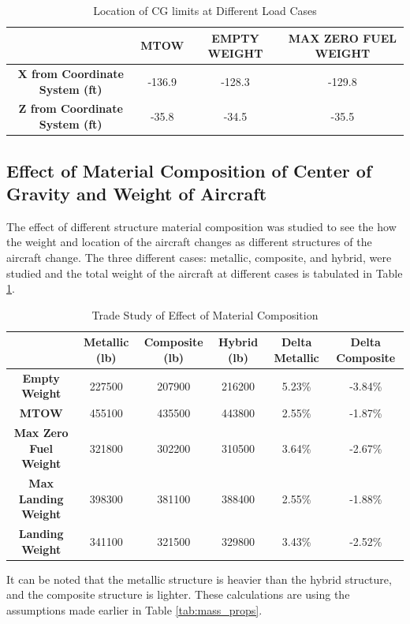 \begin{table}[!h]
\centering
\caption{Location of CG limits at Different Load Cases}
\begin{tabular}{|c||c|c|c|}
\hline
 & \textbf{MTOW} & \textbf{EMPTY WEIGHT} & \textbf{MAX ZERO FUEL WEIGHT} \\ \hline \hline
\textbf{X from Coordinate System (ft)} & -136.9 & -128.3 & -129.8 \\ \hline
\textbf{Z from Coordinate System (ft)} & -35.8 & -34.5 & -35.5 \\ \hline
\end{tabular}
\end{table}

\subsection{Effect of Material Composition of Center of Gravity and Weight of Aircraft}
The effect of different structure material composition was studied to see the how the weight and location of the aircraft changes as different structures of the aircraft change. The three different cases: metallic, composite, and hybrid, were studied and the total weight of the aircraft at different cases is tabulated in Table \ref{tab:mas_study}.

\begin{table}[!h]
\caption{Trade Study of Effect of Material Composition}
\label{tab:mas_study}
\begin{tabular}{|c||c|c|c|c|c|}
\hline
 & \textbf{Metallic (lb)} & \textbf{Composite (lb)} & \textbf{Hybrid (lb)} & \textbf{Delta Metallic} & \textbf{Delta Composite} \\ \hline \hline
\textbf{Empty Weight} & 227500 & 207900 & 216200 & 5.23\% & -3.84\% \\ \hline
\textbf{MTOW} & 455100 & 435500 & 443800 & 2.55\% & -1.87\% \\ \hline
\textbf{Max Zero Fuel Weight} & 321800 & 302200 & 310500 & 3.64\% & -2.67\% \\ \hline
\textbf{Max Landing Weight} & 398300 & 381100 & 388400 & 2.55\% & -1.88\% \\ \hline
\textbf{Landing Weight} & 341100 & 321500 & 329800 & 3.43\% & -2.52\% \\ \hline
\end{tabular}
\end{table}

It can be noted that the metallic structure is heavier than the hybrid structure, and the composite structure is lighter. These calculations are using the assumptions made earlier in Table \ref{tab:mass_props}.

